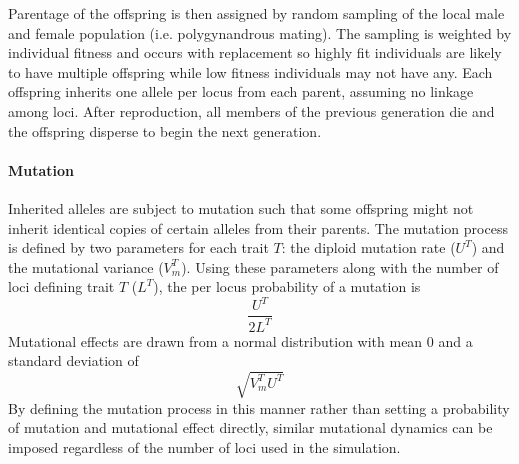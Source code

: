 \documentclass[11pt]{article}
\begin{document}
Parentage of the offspring is then assigned by random sampling of the local male and female population (i.e. polygynandrous mating). The sampling is weighted by individual fitness and occurs with replacement so highly fit individuals are likely to have multiple offspring while low fitness individuals may not have any. Each offspring inherits one allele per locus from each parent, assuming no linkage among loci. After reproduction, all members of the previous generation die and the offspring disperse to begin the next generation.

\paragraph{Mutation}
Inherited alleles are subject to mutation such that some offspring might not inherit identical copies of certain alleles from their parents. The mutation process is defined by two parameters for each trait $T$: the diploid mutation rate ($U^{T}$) and the mutational variance ($V_{m}^{T}$). Using these parameters along with the number of loci defining trait $T$ ($L^{T}$), the per locus probability of a mutation is
\begin{equation}
\frac{U^{T}}{2L^{T}}
\end{equation}
Mutational effects are drawn from a normal distribution with mean $0$ and a standard deviation of
\begin{equation}
\sqrt{V_{m}^{T}U^{T}}
\end{equation}
By defining the mutation process in this manner rather than setting a probability of mutation and mutational effect directly, similar mutational dynamics can be imposed regardless of the number of loci used in the simulation.
\end{document}
